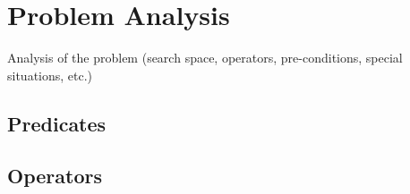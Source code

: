 \section{Problem Analysis}
\label{sec:PA}

Analysis of the problem (search space, operators, pre-conditions, special situations, etc.)

\subsection{Predicates}

\subsection{Operators}



